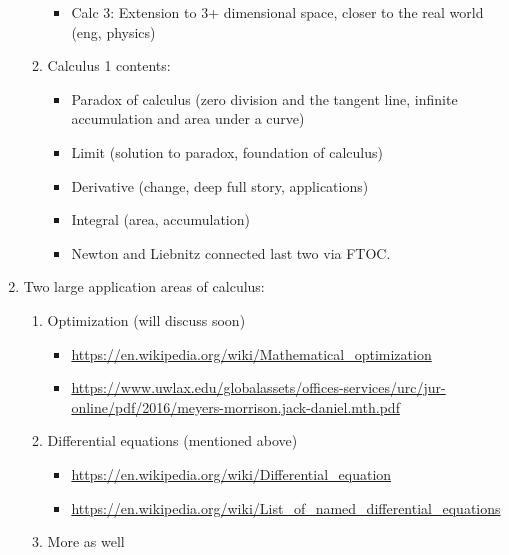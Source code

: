 \documentclass{article}
\begin{document}
\begin{enumerate}
\begin{enumerate}
\begin{itemize}
\item Calc 3: Extension to 3+ dimensional space, closer to the real world (eng, physics)
\end{itemize}
\item Calculus 1 contents: 
\begin{itemize}
\item Paradox of calculus (zero division and the tangent line, infinite accumulation and area under a curve)
\item Limit (solution to paradox, foundation of calculus)
\item Derivative (change, deep full story, applications)
\item Integral (area, accumulation)
\item Newton and Liebnitz connected last two via FTOC.
\end{itemize}
\end{enumerate}

\item Two large application areas of calculus:
\begin{enumerate}
\item Optimization (will discuss soon)
\begin{itemize}
\item \url{https://en.wikipedia.org/wiki/Mathematical_optimization}
\item \url{https://www.uwlax.edu/globalassets/offices-services/urc/jur-online/pdf/2016/meyers-morrison.jack-daniel.mth.pdf}
\end{itemize}
\item Differential equations (mentioned above)
\begin{itemize}
\item \url{https://en.wikipedia.org/wiki/Differential_equation}
\item \url{https://en.wikipedia.org/wiki/List_of_named_differential_equations}
\end{itemize}
\item More as well
\end{enumerate}


\end{enumerate}
\end{document}
